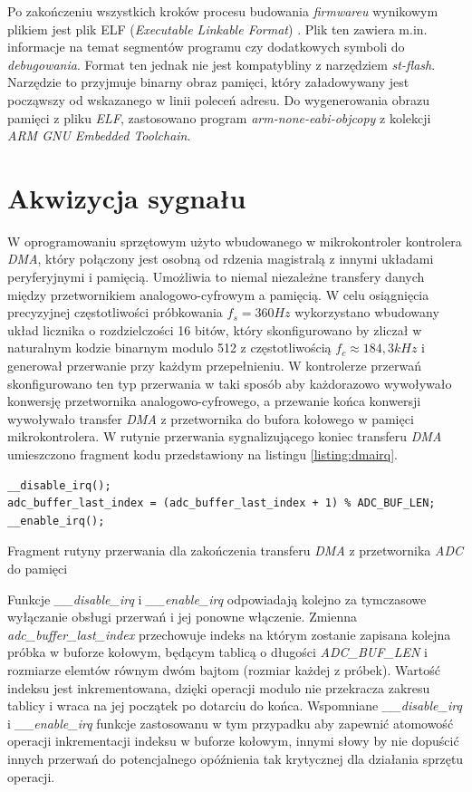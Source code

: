 Po zakończeniu wszystkich kroków procesu budowania \textit{firmwareu} wynikowym plikiem
jest plik ELF (\textit{Executable Linkable Format}) \cite{elfARM}. 
Plik ten zawiera m.in. informacje na temat segmentów programu czy dodatkowych symboli 
do \textit{debugowania}. Format ten jednak nie jest kompatybliny z narzędziem \textit{st-flash}.
Narzędzie to przyjmuje binarny obraz pamięci, który załadowywany jest począwszy od wskazanego
w linii poleceń adresu. Do wygenerowania obrazu pamięci z pliku \textit{ELF}, zastosowano program 
\textit{arm-none-eabi-objcopy} z kolekcji \textit{ARM GNU Embedded Toolchain}.

\section{Akwizycja sygnału}

W oprogramowaniu sprzętowym użyto wbudowanego w mikrokontroler kontrolera \textit{DMA}, który połączony jest
osobną od rdzenia magistralą z innymi układami peryferyjnymi i pamięcią. Umożliwia to niemal niezależne
transfery danych między przetwornikiem analogowo-cyfrowym a pamięcią.
W celu osiągnięcia precyzyjnej częstotliwości próbkowania $f_s = 360 Hz$ wykorzystano wbudowany układ licznika
o rozdzielczości 16 bitów, który skonfigurowano by zliczał w naturalnym kodzie binarnym modulo 512 z częstotliwością 
$f_c \approx 184,3 kHz$ i generował przerwanie przy każdym przepełnieniu. W kontrolerze przerwań skonfigurowano ten 
typ przerwania w taki sposób aby każdorazowo wywoływało konwersję przetwornika analogowo-cyfrowego, a przewanie
końca konwersji wywoływało transfer \textit{DMA} z przetwornika do bufora kołowego w pamięci mikrokontrolera.
W rutynie przerwania sygnalizującego koniec transferu \textit{DMA} umieszczono fragment kodu przedstawiony na listingu
\ref{listing:dmairq}.

\begin{listing}
\begin{verbatim}
__disable_irq();
adc_buffer_last_index = (adc_buffer_last_index + 1) % ADC_BUF_LEN;
__enable_irq();
\end{verbatim} 
\caption{Fragment rutyny przerwania dla zakończenia transferu \textit{DMA} z przetwornika \textit{ADC} do pamięci}
\label{listing:dmairq}
\end{listing}

Funkcje \textit{\_\_disable\_irq} i \textit{\_\_enable\_irq} odpowiadają kolejno za tymczasowe wyłączanie obsługi przerwań 
i jej ponowne włączenie.
Zmienna \textit{adc\_buffer\_last\_index} przechowuje indeks na którym zostanie zapisana kolejna próbka w buforze kołowym, będącym
tablicą o długości \textit{ADC\_BUF\_LEN} i rozmiarze elemtów równym dwóm bajtom (rozmiar każdej z próbek). Wartość
indeksu jest inkrementowana, dzięki operacji modulo nie przekracza zakresu tablicy i wraca na jej początek po dotarciu do końca.
Wspomniane \textit{\_\_disable\_irq} i \textit{\_\_enable\_irq} funkcje zastosowanu w tym przypadku aby zapewnić 
atomowość operacji inkrementacji indeksu w buforze kołowym, innymi słowy by nie dopuścić innych przerwań do 
potencjalnego opóźnienia tak krytycznej dla działania sprzętu operacji.


